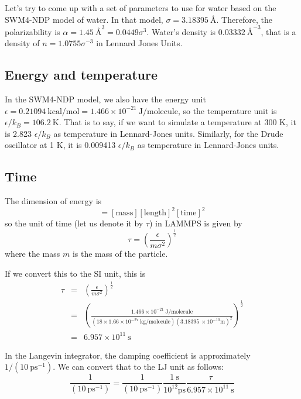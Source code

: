 \documentclass[aps, 12pt, amsmath, amssymb, onecolumn, notitlepage, nofootinbib]{revtex4-1}
\begin{document}
Let's try to come up with a set of parameters to use for water based on the SWM4-NDP model of water. In that model, $\sigma = 3.18395\ \text{\AA}$. Therefore, the polarizability is $\alpha = 1.45\ \text{\AA}^3 = 0.0449 \sigma^3$. Water's density is $0.03332\ \text{\AA}^{-3}$, that is a density of $n = 1.0755 \sigma^{-3}$ in Lennard Jones Units.


\subsection{Energy and temperature}

In the SWM4-NDP model, we also have the energy unit $\epsilon = 0.21094\ \text{kcal/mol} = 1.466 \times 10^{-21}\ \text{J/molecule}$, so the temperature unit is $\epsilon/k_B = 106.2\ \text{K}$. That is to say, if we want to simulate a temperature at 300 K, it is 2.823 $\epsilon/k_B$ as temperature in Lennard-Jones units. Similarly, for the Drude oscillator at 1 K, it is 0.009413  $\epsilon/k_B$ as temperature in Lennard-Jones units.
 

\subsection{Time}

The dimension of energy is 
\begin{equation}
[\text{energy}] = [\text{mass}][\text{length}]^2[\text{time}]^2
\end{equation}
so the unit of time (let us denote it by $\tau$) in LAMMPS is given by
\begin{equation}
\tau = \left(\frac{\epsilon}{m \sigma^2}\right)^\frac{1}{2} 
\label{tau}
\end{equation}
where the mass $m$ is the mass of the particle.

If we convert this to the SI unit, this is
\begin{eqnarray}
\tau &=&  \left(\frac{\epsilon}{m \sigma^2}\right)^\frac{1}{2} \nonumber\\
&=& \left(\frac{1.466 \times 10^{-21}\ \text{J/molecule} }{(18 \times 1.66 \times 10^{-27}\ \text{kg/molecule} ) (3.18395\ \times 10^{-10} \text{m})^2}\right)^\frac{1}{2} \nonumber\\
&=& 6.957 \times 10^{11}\ \text{s} 
\end{eqnarray}

In the Langevin integrator, the damping coefficient is approximately $1/(10\ \text{ps}^{-1})$. We can convert that to the LJ unit as follows:
\begin{equation}
\frac{1}{(10\ \text{ps}^{-1})} = \frac{1}{(10\ \text{ps}^{-1})} \frac{1\ \text{s}}{10^{12} \text{ps}}  \frac{\tau}{6.957 \times 10^{11}\ \text{s}}
\end{equation}
%






\end{document}
